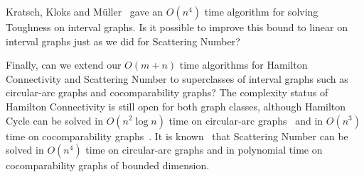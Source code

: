 \documentclass{llncs}
\begin{document}
Kratsch, Kloks and M\"uller~\cite{KKM94} gave an $O(n^4)$ time algorithm for solving {\sc Toughness} on interval graphs. Is it possible to improve this bound to linear on interval graphs just as we did for 
{\sc Scattering Number}?

Finally, can we extend our $O(m+n)$ time algorithms for {\sc Hamilton Connectivity} and {\sc Scattering Number} to superclasses of interval graphs such as circular-arc graphs and cocomparability graphs? 
The complexity status of {\sc Hamilton Connectivity} is still open for both graph classes, although {\sc Hamilton Cycle} can be solved in $O(n^2\log n)$ time on circular-arc graphs~\cite{SCH92} and in $O(n^3)$ time on cocomparability graphs~\cite{DS94}. It is known~\cite{KKM94} that {\sc Scattering Number} can be solved in $O(n^4)$ time on circular-arc graphs and in polynomial time on cocomparability graphs of bounded dimension.
\end{document}
